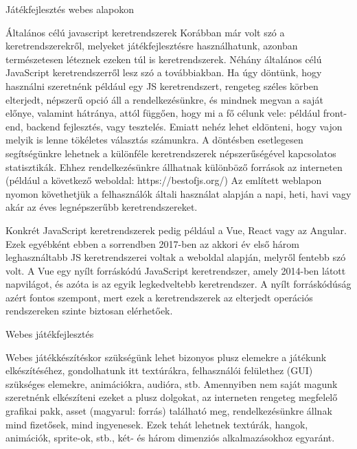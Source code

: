 \begin{MyChapter}{Játékfejlesztés webes alapokon}
	\begin{MySection}{Általános célú javascript keretrendszerek}
		Korábban már volt szó a keretrendszerekről, melyeket játékfejlesztésre használhatunk, azonban természetesen léteznek ezeken túl is keretrendszerek. Néhány általános célú JavaScript keretrendszerről lesz szó a továbbiakban.
		Ha úgy döntünk, hogy használni szeretnénk például egy JS keretrendszert, rengeteg széles körben elterjedt, népszerű opció áll a rendelkezésünkre, és mindnek megvan a saját előnye, valamint hátránya, attól függően, hogy mi a fő célunk vele: például front-end, backend fejlesztés, vagy tesztelés. Emiatt nehéz lehet eldönteni, hogy vajon melyik is lenne tökéletes választás számunkra. A döntésben esetlegesen segítségünkre lehetnek a különféle keretrendszerek népszerűségével kapcsolatos statisztikák. Ehhez rendelkezésünkre állhatnak különböző források az interneten (például a következő weboldal: https://bestofjs.org/)
		Az említett weblapon nyomon követhetjük a felhasználók általi használat alapján a napi, heti, havi vagy akár az éves legnépszerűbb keretrendszereket.
		
		Konkrét JavaScript keretrendszerek pedig például a Vue, React vagy az Angular. Ezek egyébként ebben a sorrendben 2017-ben az akkori év első három leghasználtabb JS keretrendszerei voltak a weboldal alapján, melyről fentebb szó volt.
		A Vue egy nyílt forráskódú JavaScript keretrendszer, amely 2014-ben látott napvilágot, és azóta is az egyik legkedveltebb keretrendszer. A nyílt forráskódúság azért fontos szempont, mert ezek a keretrendszerek az elterjedt operációs rendszereken szinte biztosan elérhetőek.
	\end{MySection}

	\begin{MySection}{Webes játékfejlesztés}
		
		Webes játékkészítéskor szükségünk lehet bizonyos plusz elemekre a játékunk elkészítéséhez, gondolhatunk itt textúrákra, felhasználói felülethez (GUI) szükséges elemekre, animációkra, audióra, stb. Amennyiben nem saját magunk szeretnénk elkészíteni ezeket a plusz dolgokat, az interneten rengeteg megfelelő grafikai pakk, asset (magyarul: forrás) található meg, rendelkezésünkre állnak mind fizetősek, mind ingyenesek. Ezek tehát lehetnek textúrák, hangok, animációk, sprite-ok, stb., két- és három dimenziós alkalmazásokhoz egyaránt. 
		

\end{MySection}
\end{MyChapter}
